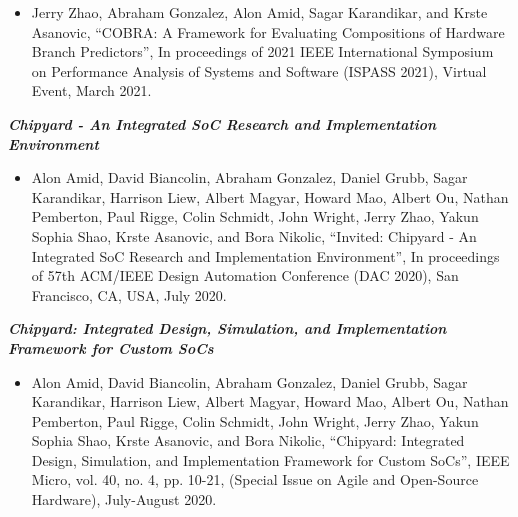 \documentclass[letter]{res}
\begin{document}
\begin{resume}
 \vspace{-4mm}

\begin{itemize}
 \item Jerry Zhao, Abraham Gonzalez, Alon Amid, Sagar Karandikar, and Krste Asanovic, ``COBRA: A Framework for Evaluating Compositions of Hardware Branch Predictors'', In proceedings of 2021 IEEE International Symposium on Performance Analysis of Systems and Software (ISPASS 2021), Virtual Event, March 2021.
\end{itemize}

\vspace{-2mm}

{\sl \textbf{Chipyard - An Integrated SoC Research and Implementation Environment}}\\

 \vspace{-4mm}

\begin{itemize}
 \item Alon Amid, David Biancolin, Abraham Gonzalez, Daniel Grubb, Sagar Karandikar, Harrison Liew, Albert Magyar, Howard Mao, Albert Ou, Nathan Pemberton, Paul Rigge, Colin Schmidt, John Wright, Jerry Zhao, Yakun Sophia Shao, Krste Asanovic, and Bora Nikolic, ``Invited: Chipyard - An Integrated SoC Research and Implementation Environment'', In proceedings of 57th ACM/IEEE Design Automation Conference (DAC 2020), San Francisco, CA, USA, July 2020.
\end{itemize}

\vspace{-2mm}

{\sl \textbf{Chipyard: Integrated Design, Simulation, and Implementation Framework for Custom SoCs}}\\

 \vspace{-4mm}

\begin{itemize}
 \item Alon Amid, David Biancolin, Abraham Gonzalez, Daniel Grubb, Sagar Karandikar, Harrison Liew, Albert Magyar, Howard Mao, Albert Ou, Nathan Pemberton, Paul Rigge, Colin Schmidt, John Wright, Jerry Zhao, Yakun Sophia Shao, Krste Asanovic, and Bora Nikolic, ``Chipyard: Integrated Design, Simulation, and Implementation Framework for Custom SoCs'', IEEE Micro, vol. 40, no. 4, pp. 10-21, (Special Issue on Agile and Open-Source Hardware), July-August 2020.
\end{itemize}


\end{resume}
\end{document}
